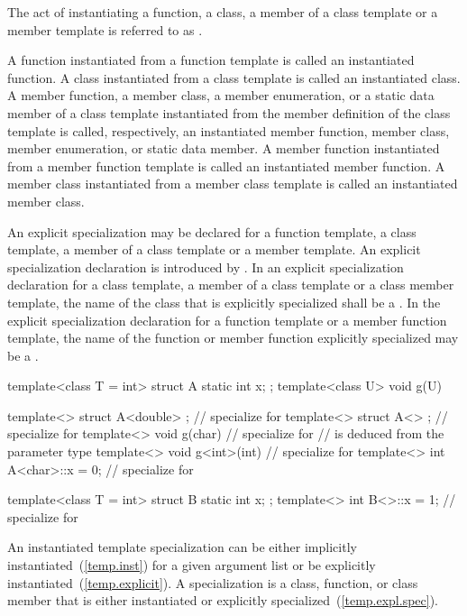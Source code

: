 \pnum
{}%
The act of instantiating a function, a class, a member of a class template or
a member template is referred to as
.

\pnum
A function instantiated from a function template is called an instantiated
function.
A class instantiated from a class template is called an instantiated class.
A member function, a member class, a member enumeration, or a static data member of a class template
instantiated from the member definition of the class template is called,
respectively, an instantiated member function, member class, member enumeration, or static data
member.
A member function instantiated from a member function template is called an
instantiated member function.
A member class instantiated from a member class template is called an
instantiated member class.

\pnum
An explicit specialization may be declared for a function template,
a class template, a member of a class template or a member template.
An explicit specialization declaration is introduced by
.
In an explicit specialization declaration for a class template,
a member of a class template or a class member template,
the name of the class that is explicitly specialized shall be a
.
In the explicit specialization declaration for a function template or
a member function template,
the name of the function or member function explicitly specialized may be a
.
\enterexample

\begin{codeblock}
template<class T = int> struct A {
  static int x;
};
template<class U> void g(U) { }

template<> struct A<double> { };        // specialize for 
template<> struct A<> { };              // specialize for 
template<> void g(char) { }             // specialize for 
                                        //  is deduced from the parameter type
template<> void g<int>(int) { }         // specialize for 
template<> int A<char>::x = 0;          // specialize for 

template<class T = int> struct B {
  static int x;
};
template<> int B<>::x = 1;              // specialize for 
\end{codeblock}
\exitexample

\pnum
An instantiated template specialization can be either implicitly
instantiated~(\ref{temp.inst}) for a given argument list or be explicitly
instantiated~(\ref{temp.explicit}).
A specialization is a class, function, or class member that is either
instantiated or explicitly specialized~(\ref{temp.expl.spec}).

